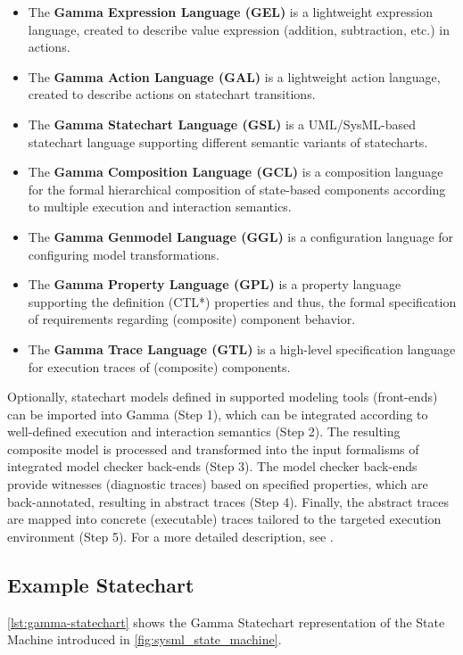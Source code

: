 \begin{itemize}
	\item The \textbf{Gamma Expression Language (GEL)} is a lightweight expression language, created to describe value expression (addition, subtraction, etc.) in actions.
	\item The \textbf{Gamma Action Language (GAL)} is a lightweight action language, created to describe actions on statechart transitions.
	\item The \textbf{Gamma Statechart Language (GSL)} is a UML/SysML-based statechart language supporting different semantic variants of statecharts.
	\item The \textbf{Gamma Composition Language (GCL)} is a composition language for the formal hierarchical composition of state-based 	components according to multiple execution and interaction semantics.
	\item The \textbf{Gamma Genmodel Language (GGL)} is a configuration language for configuring model transformations.
	\item The \textbf{Gamma Property Language (GPL)} is a property language supporting the definition (CTL*) properties and thus, the formal specification of requirements regarding (composite)	component behavior.
	\item The \textbf{Gamma Trace Language (GTL)} is a high-level specification language for  execution traces of (composite) components.
\end{itemize}

Optionally, statechart models defined in supported modeling tools (front-ends) can be imported into Gamma (Step 1), which can be integrated according to well-defined execution and interaction semantics (Step 2). The resulting composite model is processed and transformed into the input formalisms of integrated model checker back-ends (Step 3). The model checker back-ends provide witnesses (diagnostic traces) based on specified properties, which are back-annotated, resulting in abstract traces (Step 4).
Finally, the abstract traces are mapped into concrete (executable) traces tailored to the targeted execution environment (Step 5). For a more detailed description, see \cite{mixed_statecharts_2020}.

\subsection{Example Statechart}

\autoref{lst:gamma-statechart} shows the Gamma Statechart representation of the State Machine introduced in \autoref{fig:sysml_state_machine}.

